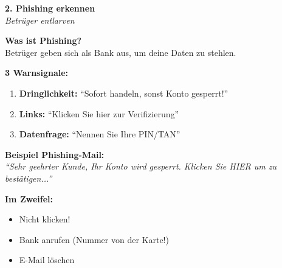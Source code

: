 \documentclass[a4paper,landscape,8pt]{extarticle}
\begin{document}
\hfill%
\begin{minipage}[t]{0.32\linewidth}
\begin{center}
\colorbox{warnred!15}{%
\begin{minipage}{0.95\linewidth}
\vspace{2mm}
\begin{center}
{\Large\bfseries\textcolor{warnred}{2. Phishing erkennen}}\\[1pt]
{\footnotesize\itshape Betrüger entlarven}
\end{center}
\vspace{2mm}
\end{minipage}%
}
\end{center}

\vspace{1mm}

\textbf{Was ist Phishing?}\\
Betrüger geben sich als Bank aus, um deine Daten zu stehlen.

\textbf{3 Warnsignale:}
\begin{enumerate}
\item \textbf{Dringlichkeit:} ``Sofort handeln, sonst Konto gesperrt!''
\item \textbf{Links:} ``Klicken Sie hier zur Verifizierung''
\item \textbf{Datenfrage:} ``Nennen Sie Ihre PIN/TAN''
\end{enumerate}

\textbf{Beispiel Phishing-Mail:}\\
{\footnotesize\itshape ``Sehr geehrter Kunde, Ihr Konto wird gesperrt. Klicken Sie HIER um zu bestätigen...''}

\vspace{2mm}

\vspace{2mm}

\textbf{Im Zweifel:}
\begin{itemize}
\item Nicht klicken!
\item Bank anrufen (Nummer von der Karte!)
\item E-Mail löschen
\end{itemize}

\end{minipage}%
\end{document}
